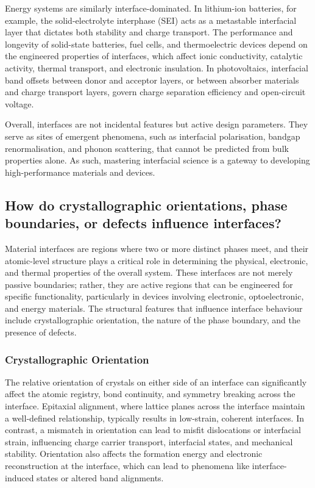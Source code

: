 Energy systems are similarly interface-dominated. In lithium-ion batteries, for example, the solid-electrolyte
interphase (SEI) acts as a metastable interfacial layer that dictates both stability and charge transport. The
performance and longevity of solid-state batteries, fuel cells, and thermoelectric devices depend on the engineered
properties of interfaces, which affect ionic conductivity, catalytic activity, thermal transport, and electronic
insulation. In photovoltaics, interfacial band offsets between donor and acceptor layers, or between absorber
materials and charge transport layers, govern charge separation efficiency and open-circuit voltage.

Overall, interfaces are not incidental features but active design parameters. They serve as sites of emergent
phenomena, such as interfacial polarisation, bandgap renormalisation, and phonon scattering, that cannot be
predicted from bulk properties alone. As such, mastering interfacial science is a gateway to developing
high-performance materials and devices.

\subsection{How do crystallographic orientations, phase boundaries, or defects influence interfaces?}

Material interfaces are regions where two or more distinct phases meet, and their atomic-level structure plays a
critical role in determining the physical, electronic, and thermal properties of the overall system. These
interfaces are not merely passive boundaries; rather, they are active regions that can be engineered for specific
functionality, particularly in devices involving electronic, optoelectronic, and energy materials. The structural
features that influence interface behaviour include crystallographic orientation, the nature of the phase boundary,
and the presence of defects.

\subsubsection{Crystallographic Orientation}

The relative orientation of crystals on either side of an interface can significantly affect the atomic registry,
bond continuity, and symmetry breaking across the interface. Epitaxial alignment, where lattice planes across the
interface maintain a well-defined relationship, typically results in low-strain, coherent interfaces. In contrast, a
mismatch in orientation can lead to misfit dislocations or interfacial strain, influencing charge carrier transport,
interfacial states, and mechanical stability. Orientation also affects the formation energy and electronic
reconstruction at the interface, which can lead to phenomena like interface-induced states or altered band alignments.

